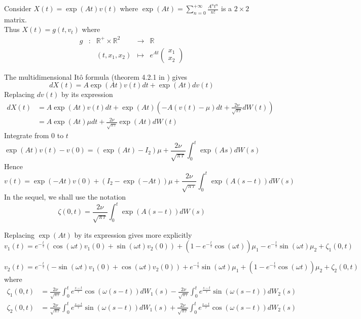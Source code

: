 \documentclass[11pt]{article}
\newcommand {\1}{\mathbb{1}}
\begin{document}
Consider $X(t)=\exp(At)v(t)$ where $\exp(At)=\sum_{n=0}^{+\infty} \frac{A^n t^n}{n!}$ is a $2 \times 2$ matrix.\\
Thus $X(t)=g(t,v_t)$ where 
\[\begin{array}{ccccc}
	g & : & \mathbb{R}^+ \times \mathbb{R}^2 & \longrightarrow & \mathbb{R} \\
	& & (t,x_1,x_2) & \longmapsto & e^{A t}
	\begin{pmatrix} 
		x_1 \\
		x_2 \end{pmatrix}
\end{array}\]


The multidimensional Itô formula (theorem 4.2.1 in \cite{oksendal}) gives
\[dX(t)=A\exp(At) v(t) dt +\exp(At) dv(t)\]
Replacing $dv(t)$ by its expression 
\begin{align*}
	dX(t)&=A\exp(At) v(t) dt +\exp(At)\left(-A(v(t)-\mu)dt+\frac{2\nu}{\sqrt{\pi \tau}} dW(t) \right)\\
	&=A\exp(At) \mu dt+\frac{2\nu}{\sqrt{\pi \tau}} \exp(At)dW(t)
\end{align*}
Integrate from $0$ to $t$
\[\exp(At)v(t)-v(0)=(\exp(At)-I_2) \mu +\frac{2\nu}{\sqrt{\pi \tau}} \int_{0}^{t} \exp(As) dW(s)\]
Hence
\begin{equation}
	v(t)=\exp(-At) v(0)+ (I_2-\exp(-At))\mu +\frac{2\nu}{\sqrt{\pi \tau}}\int_{0}^{t} \exp(A(s-t)) dW(s)
	\label{eq: RACVM solution}
\end{equation}
In the sequel, we shall use the notation 
\[\zeta(0,t) =\frac{2\nu}{\sqrt{\pi \tau}}\int_{0}^{t} \exp(A(s-t)) dW(s)\] 

Replacing $\exp(At)$ by its expression gives more explicitly
\begin{equation}
	v_1(t)=e^{-\frac{t}{\tau}} \left(\cos(\omega t)v_1(0)+\sin(\omega t)v_2(0)\right)+(1-e^{-\frac{t}{\tau}}\cos(\omega t))\mu_1-e^{-\frac{t}{\tau}} \sin(\omega t) \mu_2 +\zeta_1(0,t)
	\label{eq: first random component RACVM}
\end{equation}


\begin{equation}
	v_2(t)=e^{-\frac{t}{\tau}} \left(-\sin(\omega t)v_1(0)+\cos(\omega t)v_2(0)\right)+e^{-\frac{t}{\tau}} \sin(\omega t) \mu_1+(1-e^{-\frac{t}{\tau}}\cos(\omega t))\mu_2 +\zeta_2(0,t)
	\label{eq: second random component RACVM}
\end{equation}
where \begin{align*}
	\zeta_1(0,t)&=\frac{2\nu}{\sqrt{\pi \tau}} \int_0^t e^{\frac{s-t}{\tau}} \cos(\omega(s-t)) dW_1(s) -\frac{2\nu}{\sqrt{\pi \tau}} \int_0^t e^{\frac{s-t}{\tau}} \sin(\omega(s-t)) dW_2(s) \\
	\zeta_2(0,t)&=\frac{2\nu}{\sqrt{\pi \tau}} \int_0^t e^{\frac{s-t}{\tau}} \sin(\omega(s-t)) dW_1(s) +\frac{2\nu}{\sqrt{\pi \tau}} \int_0^t e^{\frac{s-t}{\tau}} \cos(\omega(s-t)) dW_2(s)
\end{align*}
\end{document}
